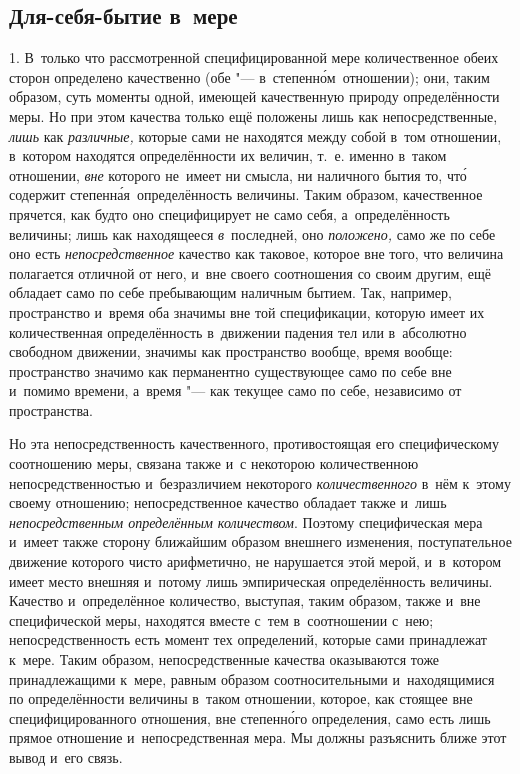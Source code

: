 \subsection{Для-себя-бытие в~мере}

1. В~только что рассмотренной специфицированной мере количественное обеих
сторон определено качественно (обе "--- в~степенн\'{о}м~отношении); они, таким
образом, суть моменты одной, имеющей качественную природу определённости меры.
Но при этом качества только ещё положены лишь как непосредственные, {\em лишь}
как {\em различные,} которые сами не находятся между собой в~том отношении,
в~котором находятся определённости их величин, т.~е. именно в~таком отношении,
{\em вне} которого не~имеет ни смысла, ни наличного бытия то, чт\'{о} содержит
степенн\'{а}я~определённость величины. Таким образом, качественное прячется,
как будто оно специфицирует не само себя, а~определённость величины; лишь как
находящееся {\em в}~последней, оно {\em положено,} само же по себе оно есть
{\em непосредственное} качество как таковое, которое вне того, что величина
полагается отличной от него, и~вне своего соотношения со своим другим, ещё
обладает само по себе пребывающим наличным бытием. Так, например, пространство
и~время оба значимы вне той спецификации, которую имеет их количественная
определённость в~движении падения тел или в~абсолютно свободном движении,
значимы как пространство вообще, время вообще: пространство значимо как
перманентно существующее само по себе вне и~помимо времени, а~время "--- как
текущее само по себе, независимо от пространства.

Но эта непосредственность качественного, противостоящая его специфическому
соотношению меры, связана также и~с некоторою количественною
непосредственностью и~безразличием некоторого {\em количественного} в~нём
к~этому своему отношению; непосредственное качество обладает также и~лишь
{\em непосредственным определённым количеством}. Поэтому специфическая мера
и~имеет также сторону ближайшим образом внешнего изменения, поступательное
движение которого чисто арифметично, не нарушается этой мерой, и~в~котором
имеет место внешняя и~потому лишь эмпирическая определённость величины.
Качество и~определённое количество, выступая, таким образом, также и~вне
специфической меры, находятся вместе с~тем в~соотношении с~нею;
непосредственность есть момент тех определений, которые сами принадлежат
к~мере. Таким образом, непосредственные качества оказываются тоже
принадлежащими к~мере, равным образом соотносительными и~находящимися по
определённости величины в~таком отношении, которое, как стоящее вне
специфицированного отношения, вне степенн\'{о}го определения, само есть лишь
прямое отношение и~непосредственная мера. Мы должны разъяснить ближе этот
вывод и~его связь.

